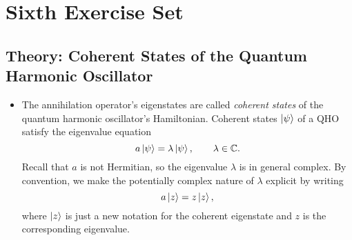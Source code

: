 \documentclass[11pt, a4paper]{article}
\begin{document}
\section{Sixth Exercise Set}

\subsection{Theory: Coherent States of the Quantum Harmonic Oscillator}
\begin{itemize}
	\item The annihilation operator's eigenstates are called \textit{coherent states} of the quantum harmonic oscillator's Hamiltonian. Coherent states  $ \ket{\psi} $ of a QHO satisfy the eigenvalue equation
	\begin{equation*}
		a \ket{\psi} = \lambda \ket{\psi}, \qquad \lambda \in \mathbb{C}.
	\end{equation*}
	Recall that $ a $ is not Hermitian, so the eigenvalue $ \lambda $ is in general complex. By convention, we make the potentially complex nature of $ \lambda $ explicit by writing 
	\begin{equation*}
		a \ket{z} = z \ket{z},
	\end{equation*}
	where $ \ket{z} $ is just a new notation for the coherent eigenstate and $ z $ is the corresponding eigenvalue.
	

\end{itemize}
\end{document}
